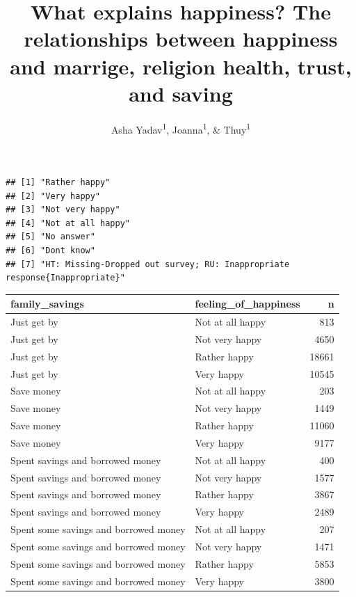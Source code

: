\documentclass[man,floatsintext]{apa6}
\title{What explains happiness? The relationships between happiness and marrige, religion health, trust, and saving}
\author{Asha Yadav\textsuperscript{1}, Joanna\textsuperscript{1}, \& Thuy\textsuperscript{1}}
\date{}
\affiliation{
\vspace{0.5cm}
\textsuperscript{1} University of Oregon}
\begin{document}
\maketitle

\begin{verbatim}
## [1] "Rather happy"                                                             
## [2] "Very happy"                                                               
## [3] "Not very happy"                                                           
## [4] "Not at all happy"                                                         
## [5] "No answer"                                                                
## [6] "Dont know"                                                                
## [7] "HT: Missing-Dropped out survey; RU: Inappropriate response{Inappropriate}"
\end{verbatim}

\begin{tabular}{l|l|r}
\hline
family\_savings & feeling\_of\_happiness & n\\
\hline
Just get by & Not at all happy & 813\\
\hline
Just get by & Not very happy & 4650\\
\hline
Just get by & Rather happy & 18661\\
\hline
Just get by & Very happy & 10545\\
\hline
Save money & Not at all happy & 203\\
\hline
Save money & Not very happy & 1449\\
\hline
Save money & Rather happy & 11060\\
\hline
Save money & Very happy & 9177\\
\hline
Spent savings and borrowed money & Not at all happy & 400\\
\hline
Spent savings and borrowed money & Not very happy & 1577\\
\hline
Spent savings and borrowed money & Rather happy & 3867\\
\hline
Spent savings and borrowed money & Very happy & 2489\\
\hline
Spent some savings and borrowed money & Not at all happy & 207\\
\hline
Spent some savings and borrowed money & Not very happy & 1471\\
\hline
Spent some savings and borrowed money & Rather happy & 5853\\
\hline
Spent some savings and borrowed money & Very happy & 3800\\
\hline
\end{tabular}
\end{document}
